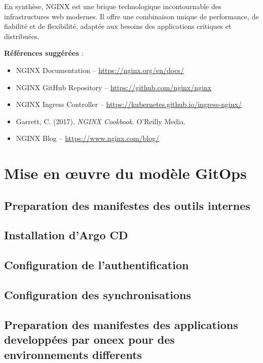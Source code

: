 En synthèse, NGINX est une brique technologique incontournable des infrastructures web modernes. Il offre une combinaison unique de performance, de fiabilité et de flexibilité, adaptée aux besoins des applications critiques et distribuées.

\textbf{Références suggérées} :
\begin{itemize}
	\item NGINX Documentation – \url{https://nginx.org/en/docs/}
	\item NGINX GitHub Repository – \url{https://github.com/nginx/nginx}
	\item NGINX Ingress Controller – \url{https://kubernetes.github.io/ingress-nginx/}
	\item Garrett, C. (2017). \textit{NGINX Cookbook}. O’Reilly Media.
	\item NGINX Blog – \url{https://www.nginx.com/blog/}
\end{itemize}

\section{Mise en œuvre du modèle GitOps}
\subsection{Preparation des manifestes des outils internes}
\subsection{Installation d'Argo CD}
\subsection{Configuration de l'authentification}
\subsection{Configuration des synchronisations}
\subsection{Preparation des manifestes des applications developpées par oneex pour des environnements differents}